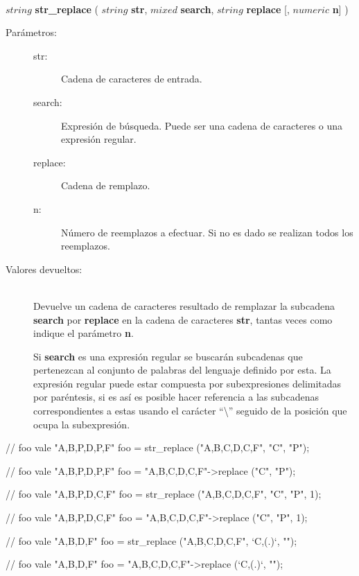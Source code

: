 \begin{framed}
\hfill \\ $string$ \textbf{str\_replace} ( $string$ \textbf{str}, $mixed$ \textbf{search}, $string$ \textbf{replace} [, $numeric$ \textbf{n}] )  
\begin{description}
\item [Parámetros:] \hfill 
   \begin{description}
   \item[str:] Cadena de caracteres de entrada.
   \item[search:] Expresión de búsqueda. Puede ser una cadena de caracteres o una expresión regular.  
   \item[replace:] Cadena de remplazo.
   \item[n:] Número de reemplazos a efectuar. Si no es dado se realizan todos los reemplazos.
   \end{description}
\item[Valores devueltos:] \hfill \\
   Devuelve un cadena de caracteres resultado de remplazar la subcadena \textbf{search}  por \textbf{replace}
   en la cadena de caracteres \textbf{str}, tantas veces como indique el parámetro \textbf{n}.
   
   Si \textbf{search} es una expresión regular se buscarán subcadenas que pertenezcan al conjunto de palabras del lenguaje definido por esta. La
   expresión regular puede estar compuesta por subexpresiones delimitadas por paréntesis, si es así es posible hacer referencia a las subcadenas 
   correspondientes a estas usando el carácter ``\textbackslash'' seguido de la posición que ocupa la subexpresión.
   
\end{description}
\end{framed}


\begin{myverbatim}
   // foo vale "A,B,P,D,P,F" 
   foo = str_replace ("A,B,C,D,C,F", "C", "P"); 
   
   // foo vale "A,B,P,D,P,F" 
   foo = "A,B,C,D,C,F"->replace ("C", "P");

   // foo vale "A,B,P,D,C,F" 
   foo = str_replace ("A,B,C,D,C,F", "C", "P", 1); 
   
   // foo vale "A,B,P,D,C,F" 
   foo = "A,B,C,D,C,F"->replace ("C", "P", 1);

   // foo vale "A,B,D,F" 
   foo = str_replace ("A,B,C,D,C,F", `C,(.)`, "\1"); 
   
   // foo vale "A,B,D,F" 
   foo = "A,B,C,D,C,F"->replace (`C,(.)`, "\1");
\end{myverbatim}

